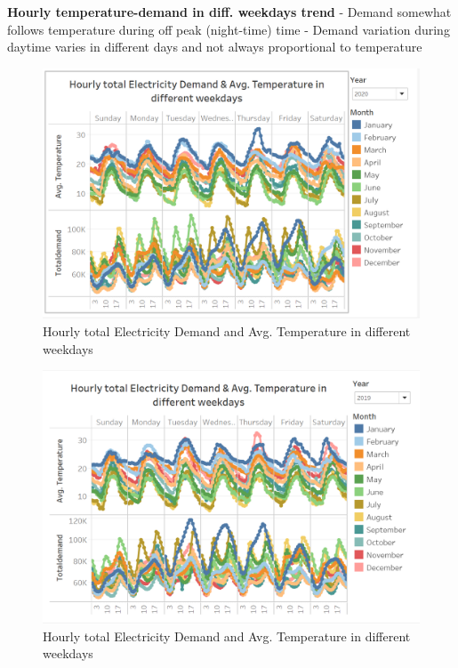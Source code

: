 \documentclass[mstat,12pt]{unswthesis}
\begin{document}
\textbf{Hourly temperature-demand in diff. weekdays trend} \newline
\newline - Demand somewhat follows temperature during off peak
(night-time) time \newline - Demand variation during daytime varies in
different days and not always proportional to temperature \newline

\begin{figure}[H]
\includegraphics{snapshots1/Slide 4 snapshot 1.png}
\caption{Hourly total Electricity Demand and Avg. Temperature in different weekdays}\label{4.4}
\end{figure}

\begin{figure}[H]
\includegraphics{snapshots1/Slide 4 snapshot 2.png}
\caption{Hourly total Electricity Demand and Avg. Temperature in different weekdays}\label{4.5}
\end{figure}
\end{document}
